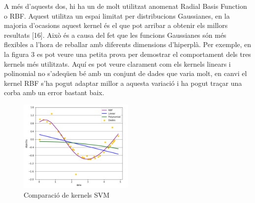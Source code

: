 \documentclass[10pt,a4paper,twocolumn,twoside]{article}
\begin{document}
A més d'aquests dos, hi ha un de molt utilitzat anomenat Radial Basis Function o RBF. Aquest utilitza un espai limitat per distribucions Gaussianes, en la majoria d'ocasions aquest kernel és el que pot arribar a obtenir els millors resultats [16]. Això és a causa del fet que les funcions Gaussianes són més flexibles a l'hora de reballar amb diferents dimensions d'hiperplà. Per exemple, en la figura 3 es pot veure una petita prova per demostrar el comportament dels tres kernels més utilitzats. Aquí es pot veure clarament com els kernels linears i polinomial no s'adeqüen bé amb un conjunt de dades que varia molt, en canvi el kernel RBF s'ha pogut adaptar millor a aquesta variació i ha pogut traçar una corba amb un error bastant baix.
\begin{figure}[!h]
\centering
	\includegraphics[width=0.5\textwidth]{../img/KernelsSVM}
	\caption{Comparació de kernels SVM}
	\label{fig-KernelsSVM}
\end{figure}
\end{document}
